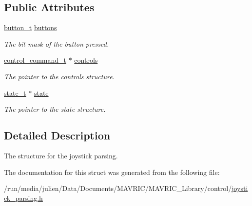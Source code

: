 \subsection*{Public Attributes}
\begin{DoxyCompactItemize}
\item 
\hypertarget{structjoystick__parsing__t_a6c2a15ce2ff700c35e4acff9d5208a4d}{\hyperlink{unionbutton__t}{button\+\_\+t} \hyperlink{structjoystick__parsing__t_a6c2a15ce2ff700c35e4acff9d5208a4d}{buttons}}\label{structjoystick__parsing__t_a6c2a15ce2ff700c35e4acff9d5208a4d}

\begin{DoxyCompactList}\small\item\em The bit mask of the button pressed. \end{DoxyCompactList}\item 
\hypertarget{structjoystick__parsing__t_af8c2ef4829e63ba7d22beba6a8abf8ca}{\hyperlink{structcontrol__command__t}{control\+\_\+command\+\_\+t} $\ast$ \hyperlink{structjoystick__parsing__t_af8c2ef4829e63ba7d22beba6a8abf8ca}{controls}}\label{structjoystick__parsing__t_af8c2ef4829e63ba7d22beba6a8abf8ca}

\begin{DoxyCompactList}\small\item\em The pointer to the controls structure. \end{DoxyCompactList}\item 
\hypertarget{structjoystick__parsing__t_a478e7545d1ae5d23581f8f894990d86c}{\hyperlink{structstate__t}{state\+\_\+t} $\ast$ \hyperlink{structjoystick__parsing__t_a478e7545d1ae5d23581f8f894990d86c}{state}}\label{structjoystick__parsing__t_a478e7545d1ae5d23581f8f894990d86c}

\begin{DoxyCompactList}\small\item\em The pointer to the state structure. \end{DoxyCompactList}\end{DoxyCompactItemize}


\subsection{Detailed Description}
The structure for the joystick parsing. 

The documentation for this struct was generated from the following file\+:\begin{DoxyCompactItemize}
\item 
/run/media/julien/\+Data/\+Documents/\+M\+A\+V\+R\+I\+C/\+M\+A\+V\+R\+I\+C\+\_\+\+Library/control/\hyperlink{joystick__parsing_8h}{joystick\+\_\+parsing.\+h}\end{DoxyCompactItemize}
